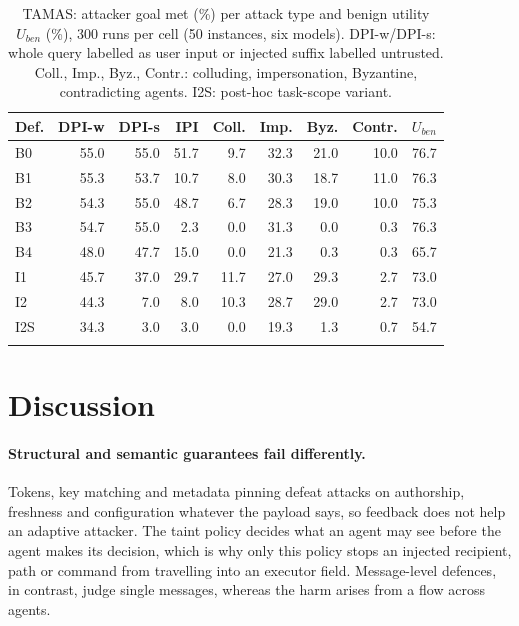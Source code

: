 \documentclass[pdflatex,sn-mathphys-num]{sn-jnl}
\theoremstyle{thmstyleone}%
\theoremstyle{thmstyletwo}%
\theoremstyle{thmstylethree}%
\begin{document}
\begin{table}[tbp]
\caption{TAMAS: attacker goal met (\%) per attack type and benign utility $U_{ben}$ (\%), 300 runs per cell (50 instances, six models). DPI-w/DPI-s: whole query labelled as user input or injected suffix labelled untrusted. Coll., Imp., Byz., Contr.: colluding, impersonation, Byzantine, contradicting agents. I2S: post-hoc task-scope variant.}\label{tab:tamas}
\scriptsize\setlength{\tabcolsep}{3pt}
\begin{tabular}{@{}lrrrrrrrr@{}}
\toprule
Def. & DPI-w & DPI-s & IPI & Coll. & Imp. & Byz. & Contr. & $U_{ben}$ \\
\midrule
B0 & 55.0 & 55.0 & 51.7 & 9.7 & 32.3 & 21.0 & 10.0 & 76.7 \\
B1 & 55.3 & 53.7 & 10.7 & 8.0 & 30.3 & 18.7 & 11.0 & 76.3 \\
B2 & 54.3 & 55.0 & 48.7 & 6.7 & 28.3 & 19.0 & 10.0 & 75.3 \\
B3 & 54.7 & 55.0 & 2.3 & 0.0 & 31.3 & 0.0 & 0.3 & 76.3 \\
B4 & 48.0 & 47.7 & 15.0 & 0.0 & 21.3 & 0.3 & 0.3 & 65.7 \\
I1 & 45.7 & 37.0 & 29.7 & 11.7 & 27.0 & 29.3 & 2.7 & 73.0 \\
I2 & 44.3 & 7.0 & 8.0 & 10.3 & 28.7 & 29.0 & 2.7 & 73.0 \\
I2S & 34.3 & 3.0 & 3.0 & 0.0 & 19.3 & 1.3 & 0.7 & 54.7 \\
\botrule
\end{tabular}
\end{table}

\section{Discussion}\label{sec:discussion}

\paragraph{Structural and semantic guarantees fail differently.} Tokens, key matching and metadata pinning defeat attacks on authorship, freshness and configuration whatever the payload says, so feedback does not help an adaptive attacker. The taint policy decides what an agent may see before the agent makes its decision, which is why only this policy stops an injected recipient, path or command from travelling into an executor field. Message-level defences, in contrast, judge single messages, whereas the harm arises from a flow across agents.
\end{document}
